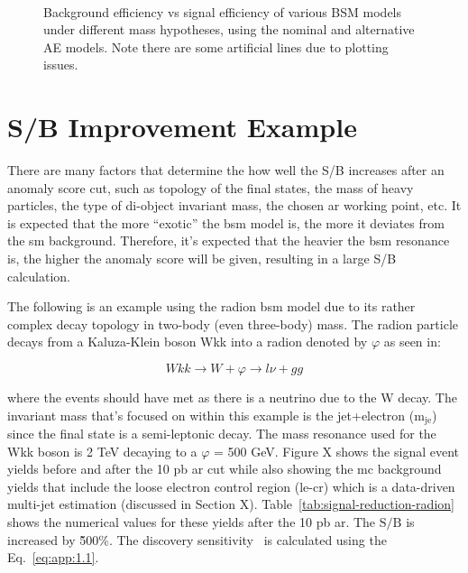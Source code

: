 \begin{figure}[H]
\begin{center}
{    }
     \\
    \end{center}
    \caption{
        Background efficiency vs signal efficiency of various BSM models under different mass hypotheses, using the nominal and alternative AE models.
        Note there are some artificial lines due to plotting issues.
    }
\label{fig:roc_rms}
\end{figure}

\newpage

\vspace*{0.5in}

\section{S/B Improvement Example}
\label{appendix:sb-improvements}
\setcounter{equation}{0}

There are many factors that determine the how well the S/B increases after an anomaly score cut, such as topology of the final states, the mass of heavy particles, the type of di-object invariant mass, the chosen \gls{ar}
working point, etc. It is expected that the more ``exotic'' the \gls{bsm} model is, the more it deviates from the \gls{sm} background. Therefore, it's expected that the heavier the \gls{bsm} resonance is, the higher 
the anomaly score will be given, resulting in a large S/B calculation. 
\par
The following is an example using the radion \gls{bsm} model due to its rather complex decay topology in two-body (even three-body) mass. The radion particle decays from a Kaluza-Klein boson Wkk into a 
radion denoted by $\varphi$ as seen in:

$$
Wkk \to W + \varphi \to l\nu + gg
$$

where the events should have \gls{met} as there is a neutrino due to the W decay. The invariant mass that's focused on within this example is the jet+electron ($\textrm{m}_{\textrm{je}}$) since the final state is 
a semi-leptonic decay. The mass resonance used for the Wkk boson is 2 TeV decaying to a $\varphi$ = 500 GeV. Figure X shows the signal event yields before and after the 10 pb \gls{ar} cut while also showing 
the \gls{mc} background yields that include the loose electron control region (\gls{le-cr}) which is a data-driven multi-jet estimation (discussed in Section X). Table~\ref{tab:signal-reduction-radion} shows the numerical values for these yields
after the 10 pb \gls{ar}. The $\textrm{S}/\textrm{B}$ is increased by \~500\%. The discovery sensitivity~\cite{disc-sens} is calculated using the Eq.~\ref{eq:app:1.1}.

